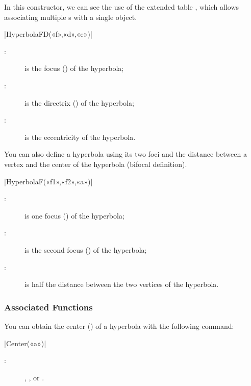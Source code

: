 \documentclass[a4paper,english]{article}
\begin{document}
In this constructor, we can see the use of the extended  table , which allows associating multiple s with a single object.
\begin{colourband}
  \macro|HyperbolaFD(«f»,«d»,«e»)|
  \begin{description}
    \item[:] is the focus () of the hyperbola;
    \item[:] is the directrix () of the hyperbola;
    \item[:] is the eccentricity of the hyperbola. 
  \end{description}
\end{colourband}

You can also define a hyperbola using its two foci and the distance between
a vertex and the center of the hyperbola (bifocal definition).

\begin{colourband}
  \macro|HyperbolaF(«f1»,«f2»,«a»)|
  \begin{description}
    \item[:] is one focus () of the hyperbola;
    \item[:] is the second focus () of the hyperbola;
    \item[:] is half the distance between the two vertices of the hyperbola. 
  \end{description}
\end{colourband}

\subsubsection{Associated Functions}

You can obtain the center () of a hyperbola with the following command:
\begin{colourband}
  \macro|Center(«a»)|
  \begin{description}
    \item[:]  , , or .
  \end{description}
\end{colourband}
\end{document}
